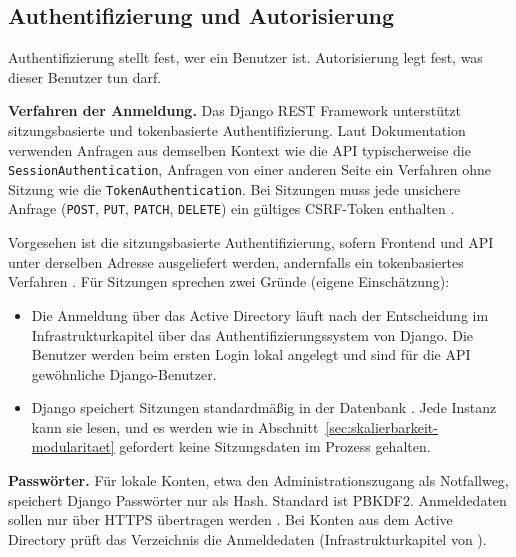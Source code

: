 \subsection{Authentifizierung und Autorisierung}
\label{subsec:authentifizierung}
Authentifizierung stellt fest, wer ein Benutzer ist. Autorisierung legt fest, was dieser Benutzer tun darf.
 
\textbf{Verfahren der Anmeldung.} Das Django REST Framework unterstützt sitzungsbasierte und tokenbasierte Authentifizierung. Laut Dokumentation verwenden Anfragen aus demselben Kontext wie die API typischerweise die \texttt{SessionAuthentication}, Anfragen von einer anderen Seite ein Verfahren ohne Sitzung wie die \texttt{TokenAuthentication}. Bei Sitzungen muss jede unsichere Anfrage (\texttt{POST}, \texttt{PUT}, \texttt{PATCH}, \texttt{DELETE}) ein gültiges CSRF-Token enthalten \parencite{drfAjaxCsrf}.
 
Vorgesehen ist die sitzungsbasierte Authentifizierung, sofern Frontend und API unter derselben Adresse ausgeliefert werden, andernfalls ein tokenbasiertes Verfahren \parencite{drfAjaxCsrf}. Für Sitzungen sprechen zwei Gründe (eigene Einschätzung):
\begin{itemize}
    \item Die Anmeldung über das Active Directory läuft nach der Entscheidung im Infrastrukturkapitel über das Authentifizierungssystem von Django. Die Benutzer werden beim ersten Login lokal angelegt und sind für die API gewöhnliche Django-Benutzer.
    \item Django speichert Sitzungen standardmäßig in der Datenbank \parencite{djangoSessions}. Jede Instanz kann sie lesen, und es werden wie in Abschnitt~\ref{sec:skalierbarkeit-modularitaet} gefordert keine Sitzungsdaten im Prozess gehalten.
\end{itemize}
 
\textbf{Passwörter.} Für lokale Konten, etwa den Administrationszugang als Notfallweg, speichert Django Passwörter nur als Hash. Standard ist PBKDF2. Anmeldedaten sollen nur über HTTPS übertragen werden \parencite{djangoPasswords}. Bei Konten aus dem Active Directory prüft das Verzeichnis die Anmeldedaten (Infrastrukturkapitel von \Jai).
 
